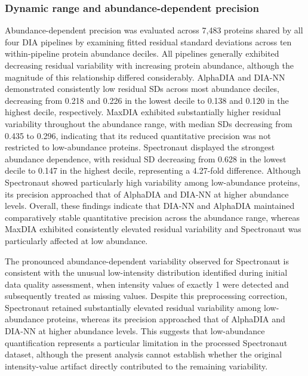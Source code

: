 \documentclass[
  10pt,
]{article}
\begin{document}
\subsubsection{Dynamic range and abundance-dependent
precision}\label{dynamic-range-and-abundance-dependent-precision}

Abundance-dependent precision was evaluated across 7,483 proteins shared
by all four DIA pipelines by examining fitted residual standard
deviations across ten within-pipeline protein abundance deciles. All
pipelines generally exhibited decreasing residual variability with
increasing protein abundance, although the magnitude of this
relationship differed considerably. AlphaDIA and DIA-NN demonstrated
consistently low residual SDs across most abundance deciles, decreasing
from 0.218 and 0.226 in the lowest decile to 0.138 and 0.120 in the
highest decile, respectively. MaxDIA exhibited substantially higher
residual variability throughout the abundance range, with median SDs
decreasing from 0.435 to 0.296, indicating that its reduced quantitative
precision was not restricted to low-abundance proteins. Spectronaut
displayed the strongest abundance dependence, with residual SD
decreasing from 0.628 in the lowest decile to 0.147 in the highest
decile, representing a 4.27-fold difference. Although Spectronaut showed
particularly high variability among low-abundance proteins, its
precision approached that of AlphaDIA and DIA-NN at higher abundance
levels. Overall, these findings indicate that DIA-NN and AlphaDIA
maintained comparatively stable quantitative precision across the
abundance range, whereas MaxDIA exhibited consistently elevated residual
variability and Spectronaut was particularly affected at low abundance.

The pronounced abundance-dependent variability observed for Spectronaut
is consistent with the unusual low-intensity distribution identified
during initial data quality assessment, when intensity values of exactly
1 were detected and subsequently treated as missing values. Despite this
preprocessing correction, Spectronaut retained substantially elevated
residual variability among low-abundance proteins, whereas its precision
approached that of AlphaDIA and DIA-NN at higher abundance levels. This
suggests that low-abundance quantification represents a particular
limitation in the processed Spectronaut dataset, although the present
analysis cannot establish whether the original intensity-value artifact
directly contributed to the remaining variability.
\end{document}
